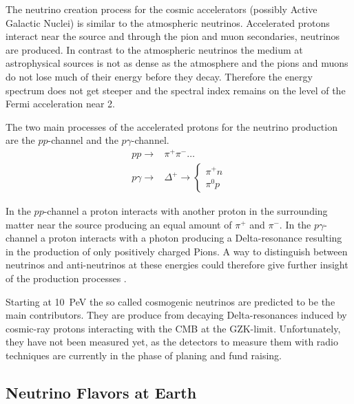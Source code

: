 The neutrino creation process for the cosmic accelerators (possibly Active Galactic Nuclei) is similar to the atmospheric neutrinos.
Accelerated protons interact near the source and through the pion and muon secondaries, neutrinos are produced.
In contrast to the atmospheric neutrinos the medium at astrophysical sources is not as dense as the atmosphere and the pions and muons do not lose much of their energy before they decay.
Therefore the energy spectrum does not get steeper and the spectral index remains on the level of the Fermi acceleration near 2.

The two main processes of the accelerated protons for the neutrino production are the $pp$-channel and the $p\gamma$-channel.
\begin{align}
    p p \to & \pi^+ \pi^- \dots \\
    p \gamma \to & \Delta^+ \to \begin{cases} \pi^+ n \\ \pi^0 p \end{cases}
\end{align}

In the $pp$-channel a proton interacts with another proton in the surrounding matter near the source producing an equal amount of $\pi^+$ and $\pi^-$.
In the $p\gamma$-channel a proton interacts with a photon producing a Delta-resonance resulting in the production of only positively charged Pions.
A way to distinguish between neutrinos and anti-neutrinos at these energies could therefore give further insight of the production processes \cite{Biehl17}.

Starting at \SI{10}{PeV} the so called cosmogenic neutrinos are predicted to be the main contributors.
They are produce from decaying Delta-resonances induced by cosmic-ray protons interacting with the CMB at the GZK-limit.
Unfortunately, they have not been measured yet, as the detectors to measure them with radio techniques are currently in the phase of planing and fund raising.

\subsection{Neutrino Flavors at Earth} \label{sec:nu_osc}

